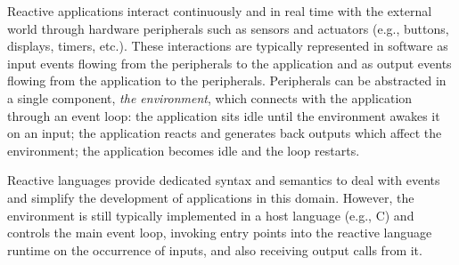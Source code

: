 \documentclass[sigplan,10pt,review,anonymous]{acmart}\settopmatter{printfolios=true,printccs=false,printacmref=false}
\begin{document}

Reactive applications interact continuously and in real time with the external
world through hardware peripherals such as sensors and actuators (e.g.,
buttons, displays, timers, etc.).
%
These interactions are typically represented in software as input events
flowing from the peripherals to the application and as output events flowing
from the application to the peripherals.
%
Peripherals can be abstracted in a
single component, \emph{the environment}, which connects with the application
through an event loop:
the application sits idle until the environment awakes it on
an input;
the application reacts and generates back outputs
which affect the environment;
the application becomes idle and the loop restarts.

Reactive languages provide dedicated syntax and semantics to deal with events
and simplify the development of applications in this domain.
%
However, the environment is still typically implemented in a host language (e.g., C)
and controls the main event loop, invoking entry points into the reactive
language runtime on the occurrence of inputs, and also receiving output calls
from it.
%

\end{document}
